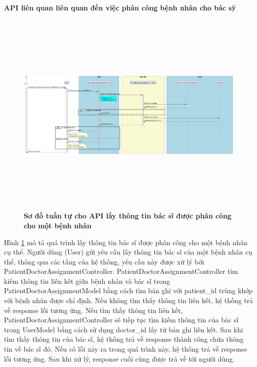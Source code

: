 \paragraph{API liên quan liên quan đến việc phân công bệnh nhân cho bác sỹ}
\mbox{}


\begin{figure}[H]
  \centering
  \includegraphics[width=16cm,height=10cm]{Images/server/sequence/server/getDoctorByPatient.png}
  \caption[Sơ đồ tuần tự cho API lấy thông tin bác sĩ được phân công cho một bệnh nhân ]{\bfseries \fontsize{12pt}{0pt}
  \selectfont Sơ đồ tuần tự cho API lấy thông tin bác sĩ được phân công cho một bệnh nhân }
  \label{getDoctorByPatient} %
\end{figure}
Hình \ref{getDoctorByPatient} mô tả quá trình lấy thông tin bác sĩ được phân công cho một bệnh nhân cụ thể. Người dùng (User) gửi yêu cầu lấy thông tin bác sĩ của một bệnh nhân cụ thể, thông qua các tầng của hệ thống, yêu cầu này được xử lý bởi PatientDoctorAssignmentController. PatientDoctorAssignmentController tìm kiếm thông tin liên kết giữa bệnh nhân và bác sĩ trong PatientDoctorAssignmentModel bằng cách tìm bản ghi với patient\_id trùng khớp với bệnh nhân được chỉ định. Nếu không tìm thấy thông tin liên kết, hệ thống trả về response lỗi tương ứng. Nếu tìm thấy thông tin liên kết, PatientDoctorAssignmentController sẽ tiếp tục tìm kiếm thông tin của bác sĩ trong UserModel bằng cách sử dụng doctor\_id lấy từ bản ghi liên kết. Sau khi tìm thấy thông tin của bác sĩ, hệ thống trả về response thành công chứa thông tin về bác sĩ đó. Nếu có lỗi xảy ra trong quá trình này, hệ thống trả về response lỗi tương ứng. Sau khi xử lý, response cuối cùng được trả về tới người dùng.


